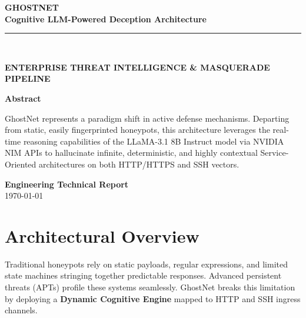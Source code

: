 \documentclass[11pt,a4paper]{report}
\begin{document}
\begin{titlepage}
    \pagecolor{NavyBlue}
    \color{white}
    \begin{center}
        \vspace*{3cm}
        
        \Huge \textbf{\textcolor{GoldHighlight}{GHOSTNET}} \\
        \vspace{0.5cm}
        \LARGE \textbf{Cognitive LLM-Powered Deception Architecture} \\
        \vspace{1cm}
        
        \rule{0.6\textwidth}{2pt} \\
        \vspace{1.5cm}
        
        \large \textbf{ENTERPRISE THREAT INTELLIGENCE \& MASQUERADE PIPELINE} \\
        \vspace{3cm}

        \Large \textbf{Abstract} \\
        \vspace{0.5cm}
        \large
        \begin{minipage}{0.8\textwidth}
        \noindent GhostNet represents a paradigm shift in active defense mechanisms. Departing from static, easily fingerprinted honeypots, this architecture leverages the real-time reasoning capabilities of the LLaMA-3.1 8B Instruct model via NVIDIA NIM APIs to hallucinate infinite, deterministic, and highly contextual Service-Oriented architectures on both HTTP/HTTPS and SSH vectors.
        \end{minipage}

        \vfill
        \textbf{\textcolor{GoldHighlight}{Engineering Technical Report}} \\
        \normalsize \today
    \end{center}
\end{titlepage}

\nopagecolor %

\tableofcontents
\newpage

\chapter{Architectural Overview}
Traditional honeypots rely on static payloads, regular expressions, and limited state machines stringing together predictable responses. Advanced persistent threats (APTs) profile these systems seamlessly. GhostNet breaks this limitation by deploying a \textbf{Dynamic Cognitive Engine} mapped to HTTP and SSH ingress channels.
\end{document}
